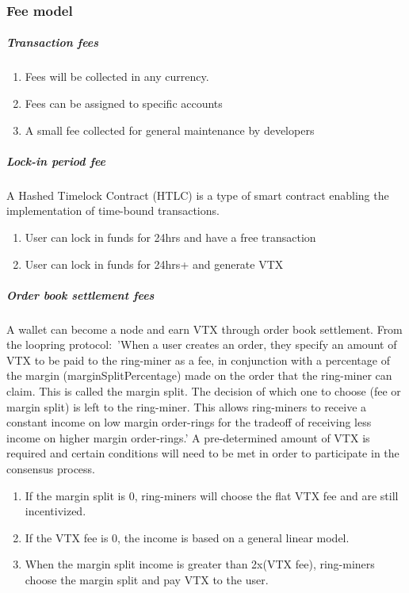 \documentclass[]{article}
\begin{document}
\subsubsection{Fee model}
\subparagraph{Transaction fees\\}
\begin{enumerate}
	\item Fees will be collected in any currency.\\
	\item Fees can be assigned to specific accounts\\
	\item A small fee collected for general maintenance by developers\\
\end{enumerate}
\subparagraph{Lock-in period fee\\}
	A Hashed Timelock Contract (HTLC)\cite{22} is a type of smart contract enabling the implementation of time-bound transactions.
\begin{enumerate}
	\item User can lock in funds for 24hrs and have a free transaction\\
	\item User can lock in funds for 24hrs+ and generate VTX \\
\end{enumerate}
\subparagraph{Order book settlement fees}
A wallet can become a node and earn VTX through order book settlement. 
From the loopring protocol:\
'When a user creates an order, they specify an amount of VTX to be paid to the ring-miner as a fee, in conjunction with a percentage of the margin (marginSplitPercentage) made on the order that the ring-miner can claim. This is
called the margin split. The decision of which one to choose
(fee or margin split) is left to the ring-miner.
This allows ring-miners to receive a constant income on 
low margin order-rings for the tradeoff of receiving less 
income on higher margin order-rings.'\cite{7}
A pre-determined amount of VTX is required and certain conditions will need to be met in order to participate in the consensus process.
\begin{enumerate}
	\item If the margin split is 0, ring-miners will choose the flat VTX fee and are still incentivized.
	\item If the VTX fee is 0, the income is based on a general linear model.
	\item When the margin split income is greater than 2x(VTX fee), ring-miners choose the margin split and pay VTX to the user. 
\end{enumerate}	
\end{document}
